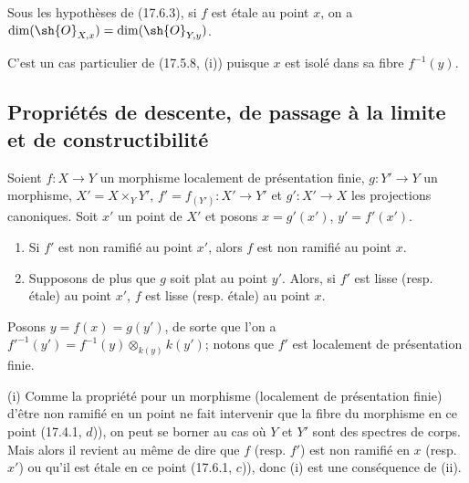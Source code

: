 \begin{proposition}[17.6.4]
\label{IV.17.6.4}
Sous les hypothèses de (17.6.3), si $f$ est étale au point $x$, on a $\dim(\sh{O}_{X,x})=\dim(\sh{O}_{Y,y})$.
\end{proposition}

C'est un cas particulier de (17.5.8, (i)) puisque $x$ est isolé dans sa fibre $f^{-1}(y)$.


\subsection{Propriétés de descente, de passage à la limite et de constructibilité}
\label{subsection:IV.17.7}
\label{IV.17.7}

\begin{proposition}[17.7.1]
\label{IV.17.7.1}
Soient $f:X\to Y$ un morphisme localement de présentation finie, $g:Y'\to Y$ un morphisme, $X'=X\times_Y Y'$, $f'=f_{(Y')}:X'\to Y'$ et $g':X'\to X$ les projections canoniques. Soit $x'$ un point de $X'$ et posons $x=g'(x')$, $y'=f'(x')$.
\begin{enumerate}
  \item[(i)] Si $f'$ est non ramifié au point $x'$, alors $f$ est non ramifié au point $x$.
  \item[(ii)] Supposons de plus que $g$ soit plat au point $y'$. Alors, si $f'$ est lisse (resp. étale) au point $x'$, $f$ est lisse (resp. étale) au point $x$.
\end{enumerate}
\end{proposition}

Posons $y=f(x)=g(y')$, de sorte que l'on a $f'^{-1}(y')=f^{-1}(y)\otimes_{k(y)}k(y')$; notons que $f'$ est localement de présentation finie.

(i) Comme la propriété pour un morphisme (localement de présentation finie) d'être non ramifié en un point ne fait intervenir que la fibre du morphisme en ce point (17.4.1, $d$)), on peut se borner au cas où $Y$ et $Y'$ sont des spectres de corps. Mais alors il revient au même de dire que $f$ (resp. $f'$) est non ramifié en $x$ (resp. $x'$) ou qu'il est étale en ce point (17.6.1, $c$)), donc (i) est une conséquence de (ii).

